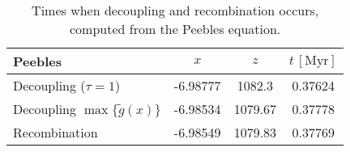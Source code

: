 \begin{table}[h]
\centering
\caption{Times when decoupling and recombination occurs, computed from the Peebles equation.}
\label{tab:M2:results:rec_and_dec_time_table_Peebles}
\begin{tabular}{l|ccc}
\toprule
                            Peebles &      $x$ &     $z$ & $t\,\mathrm{[Myr]}$ \\
\midrule
              Decoupling ($\tau=1$) & -6.98777 &  1082.3 &             0.37624 \\
Decoupling $\max\{ \tilde{g}(x) \}$ & -6.98534 & 1079.67 &             0.37778 \\
                      Recombination & -6.98549 & 1079.83 &             0.37769 \\
\bottomrule
\end{tabular}
\end{table}
